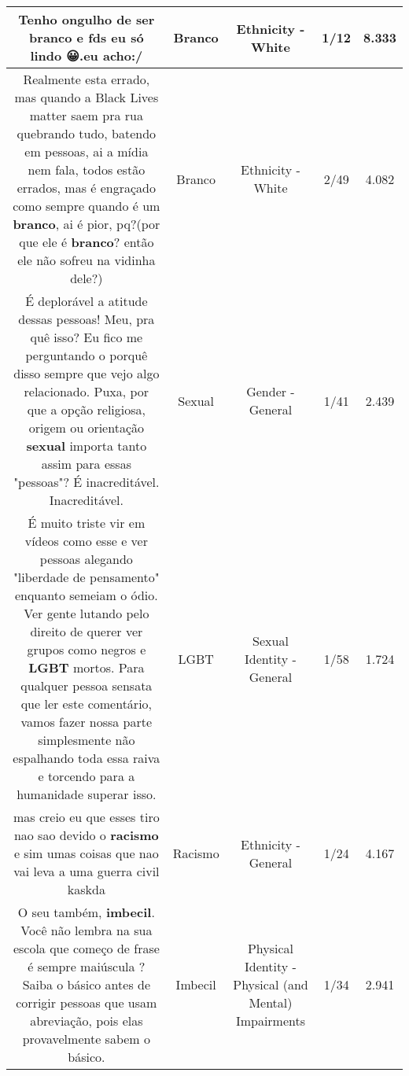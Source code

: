\documentclass[11pt]{article}
\newlength\mylength
\begin{document}
\begin{center}
\begin{longtable}{|C{.65\mylength}|C{.30\mylength}|C{.12\mylength}|C{.12\mylength}|C{.12\mylength}|}
  \small Tenho ongulho de ser \textbf{branco} e fds eu só lindo 😀.eu acho:/\normalsize   & Branco & Ethnicity - White & 1/12 & 8.333 \\  \hline
  \small Realmente esta errado, mas quando a Black Lives matter saem pra rua quebrando tudo, batendo em pessoas, ai a mídia nem fala, todos estão errados, mas é engraçado como sempre quando é um \textbf{branco}, ai é pior, pq?(por que ele é \textbf{branco}? então ele não sofreu na vidinha dele?)\normalsize   & Branco & Ethnicity - White & 2/49 & 4.082 \\  \hline
  \small É deplorável a atitude dessas pessoas! Meu, pra quê isso? Eu fico me perguntando o porquê disso sempre que vejo algo relacionado. Puxa, por que a opção religiosa, origem ou orientação \textbf{sexual} importa tanto assim para essas "pessoas"? É inacreditável. Inacreditável.\normalsize   & Sexual & Gender - General & 1/41 & 2.439 \\  \hline
  \small É muito triste vir em vídeos como esse e ver pessoas alegando "liberdade de pensamento" enquanto semeiam o ódio. Ver gente lutando pelo direito de querer ver grupos como negros e \textbf{LGBT} mortos. Para qualquer pessoa sensata que ler este comentário, vamos fazer nossa parte simplesmente não espalhando toda essa raiva e torcendo para a humanidade superar isso.\normalsize   & LGBT & Sexual Identity - General & 1/58 & 1.724 \\  \hline
  \small mas creio eu que esses tiro nao sao devido o \textbf{racismo} e sim umas coisas que nao vai leva a uma guerra civil kaskda\normalsize   & Racismo & Ethnicity - General & 1/24 & 4.167 \\  \hline
  \small O seu também, \textbf{imbecil}. Você não lembra na sua escola que começo de frase é sempre maiúscula ? Saiba o básico antes de corrigir pessoas que usam abreviação, pois elas provavelmente sabem o básico.\normalsize   & Imbecil & Physical Identity - Physical (and Mental) Impairments & 1/34 & 2.941 \\  \hline

\end{longtable}
\end{center}
\end{document}
